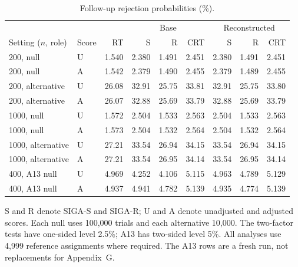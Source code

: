 \begin{table}[!htbp]
\centering
\caption{Follow-up rejection probabilities (\%).}
\label{tab:supp-focused-rates}
\begin{threeparttable}
\begin{singlespace}
\small
\setlength{\tabcolsep}{3.5pt}
\renewcommand{\arraystretch}{1.1}
\begin{tabular}{@{}llrrrrrrr@{}}
\toprule
& & & \multicolumn{3}{c}{Base} & \multicolumn{3}{c}{Reconstructed}\\
Setting ($n$, role) & Score & RT & S & R & CRT & S & R & CRT\\
\midrule
200, null & U & 1.540 & 2.380 & 1.491 & 2.451 & 2.380 & 1.491 & 2.451 \\
200, null & A & 1.542 & 2.379 & 1.490 & 2.455 & 2.379 & 1.489 & 2.455 \\
200, alternative & U & 26.08 & 32.91 & 25.75 & 33.81 & 32.91 & 25.75 & 33.80 \\
200, alternative & A & 26.07 & 32.88 & 25.69 & 33.79 & 32.88 & 25.69 & 33.79 \\
1000, null & U & 1.572 & 2.504 & 1.533 & 2.563 & 2.504 & 1.533 & 2.563 \\
1000, null & A & 1.573 & 2.504 & 1.532 & 2.564 & 2.504 & 1.532 & 2.564 \\
1000, alternative & U & 27.21 & 33.54 & 26.94 & 34.15 & 33.54 & 26.94 & 34.15 \\
1000, alternative & A & 27.21 & 33.54 & 26.95 & 34.14 & 33.54 & 26.95 & 34.14 \\
400, A13 null & U & 4.969 & 4.252 & 4.106 & 5.115 & 4.963 & 4.789 & 5.129 \\
400, A13 null & A & 4.937 & 4.941 & 4.782 & 5.139 & 4.935 & 4.774 & 5.139 \\
\bottomrule
\end{tabular}
\begin{tablenotes}[flushleft]\footnotesize
\item[] S and R denote SIGA-S and SIGA-R; U and A denote unadjusted and adjusted scores. Each null uses 100,000 trials and each alternative 10,000. The two-factor tests have one-sided level 2.5\%; A13 has two-sided level 5\%. All analyses use 4,999 reference assignments where required. The A13 rows are a fresh run, not replacements for Appendix~G.
\end{tablenotes}
\end{singlespace}
\end{threeparttable}
\end{table}
